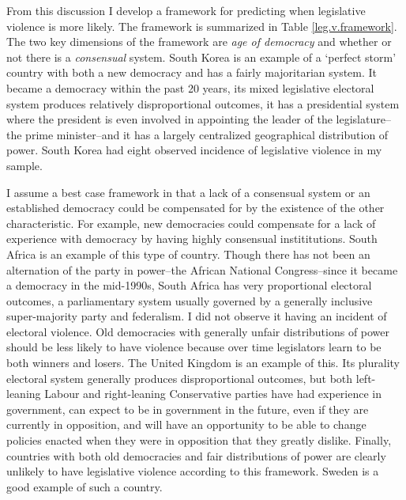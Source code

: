 \documentclass[a4paper]{article}\usepackage{graphicx, color}
\begin{document}
{From this discussion I develop a framework for predicting when legislative violence is more likely. The framework is summarized in Table \ref{leg.v.framework}. The two key dimensions of the framework are {\emph{age of democracy}} and whether or not there is a  {\emph{consensual}} system. South Korea is an example of a `perfect storm' country with both a new democracy and has a fairly majoritarian system. It became a democracy within the past 20 years, its mixed legislative electoral system produces relatively disproportional outcomes, it has a presidential system where the president is even involved in appointing the leader of the legislature--the prime minister--and it has a largely centralized geographical distribution of power. South Korea had eight observed incidence of legislative violence in my sample.

I assume a best case framework in that a lack of a consensual system or an established democracy could be compensated for by the existence of the other characteristic. For example, new democracies could compensate for a lack of experience with democracy by having highly consensual instititutions. South Africa is an example of this type of country. Though there has not been an alternation of the party in power--the African National Congress--since it became a democracy in the mid-1990s, South Africa has very proportional electoral outcomes, a parliamentary system usually governed by a generally inclusive super-majority party and federalism. I did not observe it having an incident of electoral violence. Old democracies with generally unfair distributions of power should be less likely to have violence because over time legislators learn to be both winners and losers. The United Kingdom is an example of this. Its plurality electoral system generally produces disproportional outcomes, but both left-leaning Labour and right-leaning Conservative parties have had experience in government, can expect to be in government in the future, even if they are currently in opposition, and will have an opportunity to be able to change policies enacted when they were in opposition that they greatly dislike. Finally, countries with both old democracies and fair distributions of power are clearly unlikely to have legislative violence according to this framework. Sweden is a good example of such a country. 

}
\end{document}
